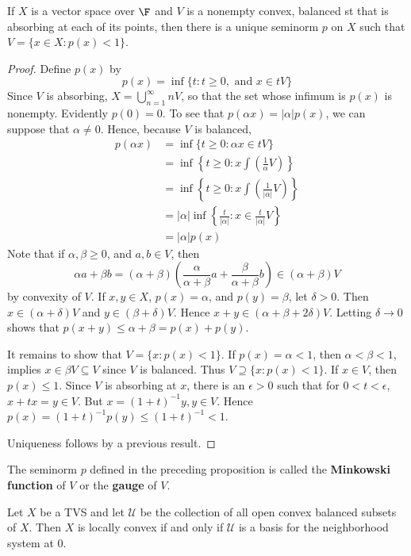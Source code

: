 \begin{prop}
    If $X$ is a vector space over $\F$ and $V$ is a nonempty convex, balanced st that is absorbing at each of its points, then there is a unique seminorm $p$ on $X$ such that $V = \{x\in X:p(x) < 1\}$.
\end{prop}
\begin{proof}
    Define $p(x)$ by $$p(x) = \inf\{t:t\geq 0,\text{ and }x\in tV\}$$
    Since $V$ is absorbing, $X = \bigcup_{n=1}^{\infty}nV$, so that the set whose infimum is $p(x)$ is nonempty. Evidently $p(0)= 0$. To see that $p(\alpha x) = |\alpha|p(x)$, we can suppose that $\alpha \neq 0$. Hence, because $V$ is balanced, \begin{align*}
        p(\alpha x) &= \inf\{t\geq 0:\alpha x \in tV\} \\
        &= \inf\left\{t\geq 0:x \int\left(\frac{1}{\alpha}V\right)\right\} \\
        &= \inf\left\{t\geq 0:x \int\left(\frac{1}{|\alpha|}V\right)\right\} \\
        &= |\alpha|\inf\left\{\frac{t}{|\alpha|}:x \in \frac{t}{|\alpha|}V\right\} \\
        &= |\alpha|p(x)
    \end{align*}
    Note that if $\alpha,\beta \geq 0$, and $a,b \in V$, then $$\alpha a+\beta b = (\alpha+\beta)\left(\frac{\alpha}{\alpha+\beta}a+\frac{\beta}{\alpha+\beta}b\right) \in (\alpha+\beta)V$$
    by convexity of $V$. If $x,y \in X$, $p(x) = \alpha$, and $p(y) = \beta$, let $\delta > 0$. Then $x \in (\alpha+\delta)V$ and $y \in (\beta+\delta)V$. Hence $x+y \in (\alpha+\beta +2\delta)V$. Letting $\delta\rightarrow 0$ shows that $p(x+y) \leq \alpha+\beta=p(x)+p(y)$.

    It remains to show that $V = \{x:p(x) < 1\}$. If $p(x) = \alpha < 1$, then $\alpha < \beta < 1$, implies $x \in \beta V\subseteq V$ since $V$ is balanced. Thus $V \supseteq \{x:p(x) < 1\}$. If $x \in V$, then $p(x) \leq 1$. Since $V$ is absorbing at $x$, there is an $\epsilon > 0$ such that for $0 < t < \epsilon$, $x+tx = y \in V$. But $x = (1+t)^{-1}y,y \in V$. Hence $p(x) = (1+t)^{-1}p(y) \leq (1+t)^{-1} < 1$.

    Uniqueness follows by a previous result.
\end{proof}

The seminorm $p$ defined in the preceding proposition is called the \textbf{Minkowski function} of $V$ or the \textbf{gauge} of $V$.

\begin{prop}
    Let $X$ be a TVS and let $\mathscr{U}$ be the collection of all open convex balanced subsets of $X$. Then $X$ is locally convex if and only if $\mathscr{U}$ is a basis for the neighborhood system at $0$.
\end{prop}



